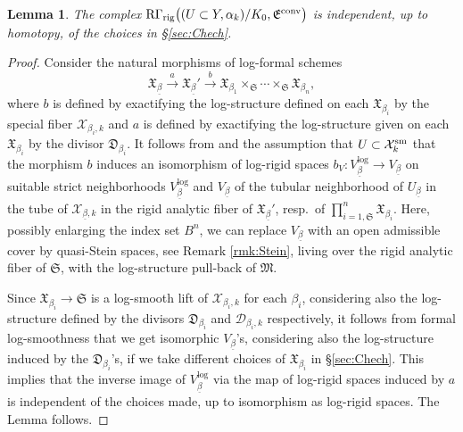 \documentclass[asterisque,english]{smfart}
\newtheorem{lemma}[theo]{Lemma}
\begin{document}
\begin{lemma}\label{lemma:indchoices} The  complex $\mathrm{R}\Gamma_{\mathrm{rig}}\bigl((U\subset Y,\alpha_k)/K_0,\mathfrak{E}^{\rm conv}\bigr) $ is independent, up to homotopy, of the choices in \S \ref{sec:Chech}. \end{lemma}
\begin{proof}  
Consider the natural morphisms of log-formal schemes $$\mathfrak{X}_{\underline{\beta}} \stackrel{a}{\longrightarrow} \mathfrak{X}_{\underline{\beta}}' \stackrel{b}{\longrightarrow} \mathfrak{X}_{\beta_1 } \times_{\mathfrak{S}} \cdots \times_{\mathfrak{S}}  \mathfrak{X}_{\beta_n } ,$$where $b$ is defined by exactifying the log-structure defined on each $\mathfrak{X}_{\beta_i}$ by the special fiber $\mathcal{X}_{\beta_i,k}$   and $a$ is defined by exactifying the log-structure given on each $\mathfrak{X}_{\beta_i}$  by the divisor $\mathfrak{D}_{\beta_i}$. It follows from \cite[Claim p. 114]{Shiho} and the assumption that $U\subset \mathcal{X}_k^{\rm sm}$ that 
the morphism $b$ induces an isomorphism of log-rigid spaces $b_V\colon V_{\underline{\beta}}^{\log} \to V_{\underline{\beta}}$ on suitable strict neighborhoods  $V_{\underline{\beta}}^{\log}$ and $V_{\underline{\beta}}$ of the tubular neighborhood of $U_{\underline{\beta}}$ in the tube  of $\mathcal{X}_{\underline{\beta},k}$ in the rigid analytic fiber of $\mathfrak{X}_{\underline{\beta}}'$, resp.~of $\prod_{i=1,\mathfrak{S}}^n \mathfrak{X}_{\beta_i }$. Here, possibly enlarging the index set $B^n$, we can replace $ V_{\underline{\beta}}$ with an open admissible cover by quasi-Stein spaces, see Remark \ref{rmk:Stein}, living over the rigid analytic fiber of $\mathfrak{S}$, with the  log-structure pull-back of $\mathfrak{M}$.

Since $\mathfrak{X}_{\beta_i} \to \mathfrak{S}$ is a log-smooth lift of $\mathcal{X}_{\beta_i,k}$ for each $\beta_i$, considering also the log-structure defined by the divisors $\mathfrak{D}_{\beta_i}$ and $\mathcal{D}_{\beta_i,k}$ respectively, it follows from formal log-smoothness that we get isomorphic $V_{\underline{\beta}}$'s, considering also the log-structure induced by the $\mathfrak{D}_{\beta_i}$'s,  if we take different choices of $\mathfrak{X}_{\beta_i}$ in \S \ref{sec:Chech}. This implies that the inverse image of $V_{\underline{\beta}}^{\log}$ via the map of log-rigid spaces induced by $a$ is independent of the choices made, up to isomorphism as log-rigid spaces. The Lemma follows.




\end{proof}
\end{document}
